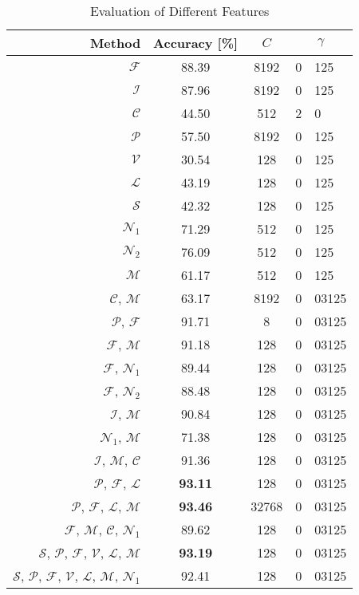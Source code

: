 \documentclass{llncs}
\begin{document}
\begin{table*}
\begin{center}%
\caption{Evaluation of Different Features}%
\begin{tabular}{r c c r@{.}l}%
\toprule%
Method & Accuracy [\%] & $C$ & \multicolumn{2}{c}{$\gamma$} \\
\midrule
$\mathcal{F}$ & 88.39 & 8192 & 0 & 125\\
$\mathcal{I}$ & 87.96 & 8192 & 0 & 125\\
$\mathcal{C}$ & 44.50 & 512 & 2 & 0\\
$\mathcal{P}$ & 57.50 & 8192 & 0 & 125\\
$\mathcal{V}$ & 30.54 & 128 & 0 & 125\\
$\mathcal{L}$ & 43.19 & 128 & 0 & 125\\
$\mathcal{S}$ & 42.32 & 128 & 0 & 125\\
$\mathcal{N}_1$ & 71.29 & 512 & 0 & 125\\
$\mathcal{N}_2$ & 76.09 & 512 & 0 & 125\\
$\mathcal{M}$ & 61.17 & 512 & 0 & 125\\
$\mathcal{C}$, $\mathcal{M}$ & 63.17 & 8192 & 0 & 03125\\
$\mathcal{P}$, $\mathcal{F}$ & 91.71 & 8 & 0 & 03125\\
$\mathcal{F}$, $\mathcal{M}$ & 91.18 & 128 & 0 & 03125\\
$\mathcal{F}$, $\mathcal{N}_1$ & 89.44 & 128 & 0 & 03125\\
$\mathcal{F}$, $\mathcal{N}_2$ & 88.48 & 128 & 0 & 03125\\
$\mathcal{I}$, $\mathcal{M}$ & 90.84 & 128 & 0 & 03125\\
$\mathcal{N}_1$, $\mathcal{M}$ & 71.38 & 128 & 0 & 03125\\
$\mathcal{I}$, $\mathcal{M}$, $\mathcal{C}$ & 91.36 & 128 & 0 & 03125\\
$\mathcal{P}$, $\mathcal{F}$, $\mathcal{L}$ & \textbf{93.11} & 128 & 0 & 03125\\
$\mathcal{P}$, $\mathcal{F}$, $\mathcal{L}$, $\mathcal{M}$ & \textbf{93.46} & 32768 & 0 & 03125\\
$\mathcal{F}$, $\mathcal{M}$, $\mathcal{C}$, $\mathcal{N}_1$ & 89.62 & 128 & 0 & 03125\\
$\mathcal{S}$, $\mathcal{P}$, $\mathcal{F}$, $\mathcal{V}$, $\mathcal{L}$, $\mathcal{M}$ & \textbf{93.19} & 128 & 0 & 03125\\
$\mathcal{S}$, $\mathcal{P}$, $\mathcal{F}$, $\mathcal{V}$, $\mathcal{L}$, $\mathcal{M}$, $\mathcal{N}_1$ & 92.41 & 128 & 0 & 03125\\
\bottomrule%
\end{tabular}%
\label{tbl:eval}%
\end{center}
\end{table*}
\end{document}
